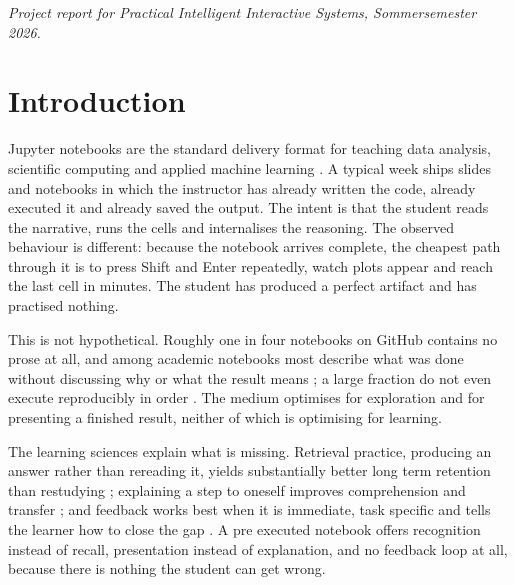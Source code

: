 \documentclass[manuscript]{acmart}
\begin{document}


\maketitle

\begin{center}
\small\itshape
Project report for \textnormal{Practical Intelligent Interactive Systems},
Sommersemester 2026.
\end{center}

\section{Introduction}

Jupyter notebooks are the standard delivery format for teaching data analysis,
scientific computing and applied machine learning \cite{kluyver2016jupyter}. A
typical week ships slides and notebooks in which the instructor has already
written the code, already executed it and already saved the output. The intent
is that the student reads the narrative, runs the cells and internalises the
reasoning. The observed behaviour is different: because the notebook arrives
complete, the cheapest path through it is to press Shift and Enter repeatedly,
watch plots appear and reach the last cell in minutes. The student has produced
a perfect artifact and has practised nothing.

This is not hypothetical. Roughly one in four notebooks on GitHub contains no
prose at all, and among academic notebooks most describe what was done without
discussing why or what the result means \cite{rule2018exploration}; a large
fraction do not even execute reproducibly in order
\cite{pimentel2019largescale}. The medium optimises for exploration and for
presenting a finished result, neither of which is optimising for learning.

The learning sciences explain what is missing. Retrieval practice, producing an
answer rather than rereading it, yields substantially better long term
retention than restudying \cite{roediger2006power}; explaining a step to
oneself improves comprehension and transfer \cite{chi1994eliciting}; and
feedback works best when it is immediate, task specific and tells the learner
how to close the gap \cite{hattie2007power}. A pre executed notebook offers
recognition instead of recall, presentation instead of explanation, and no
feedback loop at all, because there is nothing the student can get wrong.
\end{document}
